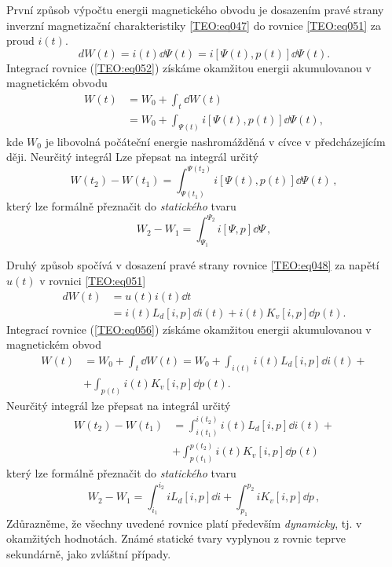       První způsob výpočtu energii magnetického obvodu je dosazením pravé strany 
      inverzní magnetizační charakteristiky \ref{TEO:eq047} do rovnice \ref{TEO:eq051} za proud 
      \(i(t)\). 
      \begin{equation}\label{TEO:eq052}
        dW(t) = i(t)\dd{\Psi(t)} = i[\Psi(t), p(t)]\dd{\Psi(t)}.
      \end{equation}
      Integrací rovnice (\ref{TEO:eq052}) získáme okamžitou energii akumulovanou v magnetickém 
      obvodu
      \begin{align}\label{TEO:eq053}
        W(t) &= W_0 + \int_t\dd{W(t)}                              \nonumber \\
             &= W_0 + \int_{\Psi(t)}i[\Psi(t), p(t)]\dd{\Psi(t)},
      \end{align}
      kde \(W_0\) je libovolná počáteční energie nashromážděná v cívce v předcházejícím ději. 
      Neurčitý integrál Lze přepsat na integrál určitý
      \begin{equation}\label{TEO:eq054}
        \boxed{W(t_2) - W(t_1)  = \int_{\Psi(t_1)}^{\Psi(t_2)}i[\Psi(t), p(t)]\dd{\Psi(t)}}\,,
      \end{equation}
      který lze formálně přeznačit do \emph{statického} tvaru
      \begin{equation}\label{TEO:eq055}
        \boxed{W_2 - W_1  = \int_{\Psi_1}^{\Psi_2}i[\Psi, p]\dd{\Psi}}\,,
      \end{equation}
      
      Druhý způsob spočívá v dosazení pravé strany rovnice \ref{TEO:eq048} za napětí \(u(t)\) v 
      rovnici \ref{TEO:eq051}
      \begin{align}\label{TEO:eq056}
        dW(t) &= u(t)i(t)\dd{t}                                \nonumber \\
              &= i(t)L_d[i,p]\dd{i(t)} + i(t)K_v[i,p]\dd{p(t)}.
      \end{align}
      Integrací rovnice (\ref{TEO:eq056}) získáme okamžitou energii akumulovanou v magnetickém obvod
      \begin{align}\label{TEO:eq057}
        W(t) &= W_0 + \int_t\dd{W(t)}
              = W_0 + \int_{i(t)}i(t)L_d[i,p]\dd{i(t)} +       \nonumber \\
             &+ \int_{p(t)}i(t)K_v[i,p]\dd{p(t)}.
      \end{align}
      Neurčitý integrál lze přepsat na integrál určitý
      \begin{align}\label{TEO:eq058}
        W(t_2) - W(t_1)  
          &= \int_{i(t_1)}^{i(t_2)}i(t)L_d[i,p]\dd{i(t)} +      \nonumber \\
          &+ \int_{p(t_1)}^{p(t_2)}i(t)K_v[i,p]\dd{p(t)}
      \end{align}
      který lze formálně přeznačit do \emph{statického} tvaru
      \begin{equation}\label{TEO:eq059}
        \boxed{W_2 - W_1  = 
            \int_{i_1}^{i_2}iL_d[i,p]\dd{i} + \int_{p_1}^{p_2}iK_v[i,p]\dd{p}}\,,
      \end{equation}
      Zdůrazněme, že všechny uvedené rovnice platí především \emph{dynamicky}, tj. v okamžitých 
      hodnotách. Známé statické tvary vyplynou z rovnic teprve sekundárně, jako zvláštní případy. 

